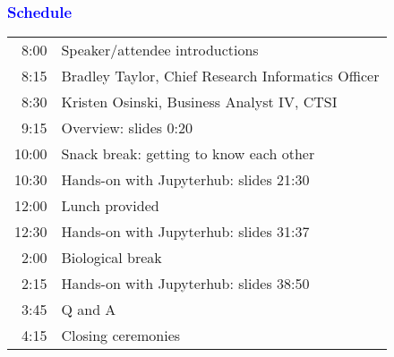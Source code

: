 \documentclass[11pt,pdftex,dvipsnames,usenames]{beamer}
\begin{document}
\begin{frame}[fragile]\frametitle{\bf\textcolor{blue}{Schedule}}

\begin{tabular}{rl}
8:00 & Speaker/attendee introductions \\
8:15 & Bradley Taylor, Chief Research Informatics Officer \\
8:30 & Kristen Osinski, Business Analyst IV, CTSI \\
9:15 & Overview: slides 0:20  \\
10:00& Snack break: getting to know each other \\
10:30& Hands-on with Jupyterhub: slides 21:30  \\
12:00& Lunch provided \\
12:30& Hands-on with Jupyterhub: slides 31:37  \\
2:00 & Biological break \\
2:15 & Hands-on with Jupyterhub: slides 38:50 \\
3:45 & Q and A \\
4:15 & Closing ceremonies
\end{tabular}

\end{frame}

\begin{comment}
\begin{frame}[fragile]\frametitle{\bf\textcolor{blue}{Outline}}

\begin{itemize}
\item Overview
\item Background
\item Timeline
\end{itemize}

\end{frame}
\end{comment}
\end{document}
